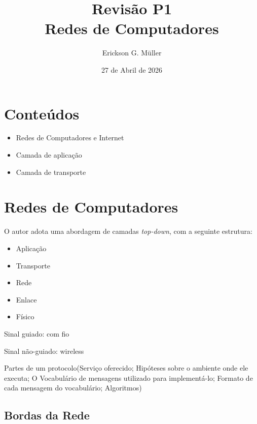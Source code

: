 \documentclass[ ]{article}
\title{Revisão P1 \\ Redes de Computadores}
\author{Erickson G. Müller}
\date{27 de Abril de 2026}
\begin{document}
\maketitle

\section*{Conteúdos}
	\begin{itemize}
		\item Redes de Computadores e Internet
		\item Camada de aplicação
		\item Camada de transporte
	\end{itemize}
	
\section{Redes de Computadores}
	O autor adota uma abordagem de camadas \textit{top-down}, com a seguinte estrutura:
	\begin{itemize}
		\item Aplicação
		\item Transporte
		\item Rede
		\item Enlace
		\item Físico
	\end{itemize}
	
	Sinal guiado: com fio
	
	Sinal não-guiado: wireless
	
	Partes de um protocolo(Serviço oferecido; Hipóteses sobre o ambiente onde ele executa; O Vocabulário de mensagens utilizado para implementá-lo; Formato de cada mensagem do vocabulário; Algoritmos)


	\subsection{Bordas da Rede}
\end{document}

